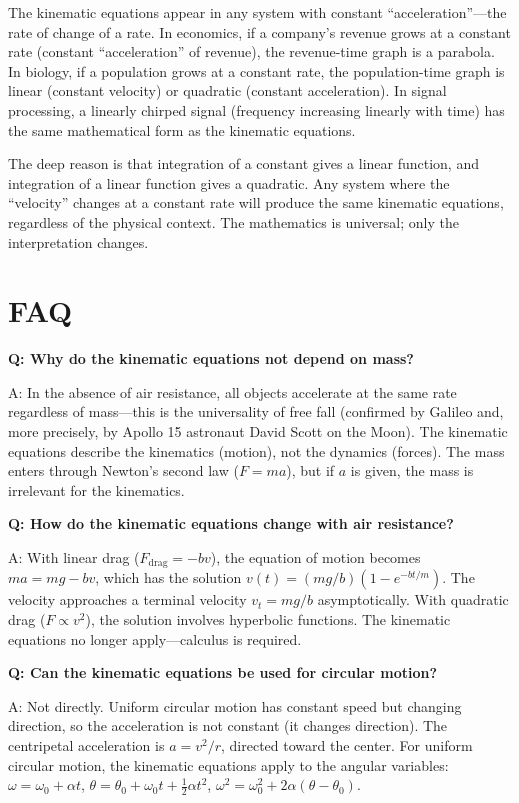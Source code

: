 \documentclass[11pt,openright]{book}
\begin{document}
The kinematic equations appear in any system with constant ``acceleration''---the rate of change of a rate. In economics, if a company's revenue grows at a constant rate (constant ``acceleration'' of revenue), the revenue-time graph is a parabola. In biology, if a population grows at a constant rate, the population-time graph is linear (constant velocity) or quadratic (constant acceleration). In signal processing, a linearly chirped signal (frequency increasing linearly with time) has the same mathematical form as the kinematic equations.

The deep reason is that integration of a constant gives a linear function, and integration of a linear function gives a quadratic. Any system where the ``velocity'' changes at a constant rate will produce the same kinematic equations, regardless of the physical context. The mathematics is universal; only the interpretation changes.

\section*{FAQ}

\textbf{Q: Why do the kinematic equations not depend on mass?}

A: In the absence of air resistance, all objects accelerate at the same rate regardless of mass---this is the universality of free fall (confirmed by Galileo and, more precisely, by Apollo 15 astronaut David Scott on the Moon). The kinematic equations describe the kinematics (motion), not the dynamics (forces). The mass enters through Newton's second law ($F = ma$), but if $a$ is given, the mass is irrelevant for the kinematics.

\textbf{Q: How do the kinematic equations change with air resistance?}

A: With linear drag ($F_{\text{drag}} = -bv$), the equation of motion becomes $ma = mg - bv$, which has the solution $v(t) = (mg/b)(1 - e^{-bt/m})$. The velocity approaches a terminal velocity $v_t = mg/b$ asymptotically. With quadratic drag ($F \propto v^2$), the solution involves hyperbolic functions. The kinematic equations no longer apply---calculus is required.

\textbf{Q: Can the kinematic equations be used for circular motion?}

A: Not directly. Uniform circular motion has constant speed but changing direction, so the acceleration is not constant (it changes direction). The centripetal acceleration is $a = v^2/r$, directed toward the center. For uniform circular motion, the kinematic equations apply to the angular variables: $\omega = \omega_0 + \alpha t$, $\theta = \theta_0 + \omega_0 t + \frac{1}{2}\alpha t^2$, $\omega^2 = \omega_0^2 + 2\alpha(\theta - \theta_0)$.
\end{document}
